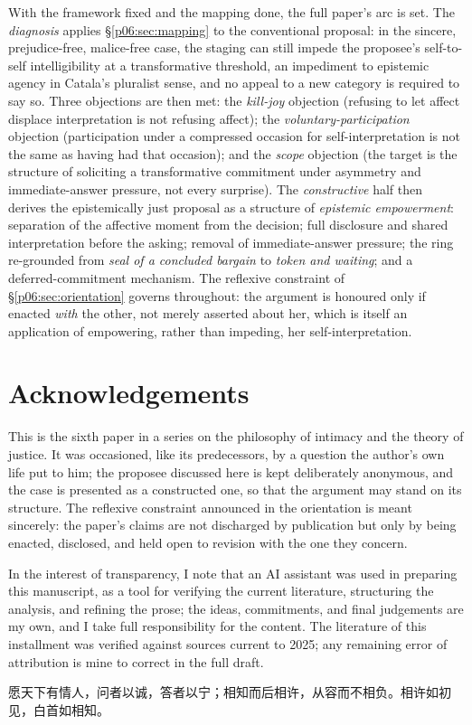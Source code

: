 \documentclass[11pt,a4paper]{article}
\begin{document}
With the framework fixed and the mapping done, the full paper's arc is set. The \emph{diagnosis} applies §\ref{p06:sec:mapping} to the conventional proposal: in the sincere, prejudice-free, malice-free case, the staging can still impede the proposee's self-to-self intelligibility at a transformative threshold, an impediment to epistemic agency in Catala's pluralist sense, and no appeal to a new category is required to say so. Three objections are then met: the \emph{kill-joy} objection (refusing to let affect displace interpretation is not refusing affect); the \emph{voluntary-participation} objection (participation under a compressed occasion for self-interpretation is not the same as having had that occasion); and the \emph{scope} objection (the target is the structure of soliciting a transformative commitment under asymmetry and immediate-answer pressure, not every surprise). The \emph{constructive} half then derives the epistemically just proposal as a structure of \emph{epistemic empowerment}: separation of the affective moment from the decision; full disclosure and shared interpretation before the asking; removal of immediate-answer pressure; the ring re-grounded from \emph{seal of a concluded bargain} to \emph{token and waiting}; and a deferred-commitment mechanism. The reflexive constraint of §\ref{p06:sec:orientation} governs throughout: the argument is honoured only if enacted \emph{with} the other, not merely asserted about her, which is itself an application of empowering, rather than impeding, her self-interpretation.

\section*{Acknowledgements}

This is the sixth paper in a series on the philosophy of intimacy and the theory of justice. It was occasioned, like its predecessors, by a question the author's own life put to him; the proposee discussed here is kept deliberately anonymous, and the case is presented as a constructed one, so that the argument may stand on its structure. The reflexive constraint announced in the orientation is meant sincerely: the paper's claims are not discharged by publication but only by being enacted, disclosed, and held open to revision with the one they concern.

In the interest of transparency, I note that an AI assistant was used in preparing this manuscript, as a tool for verifying the current literature, structuring the analysis, and refining the prose; the ideas, commitments, and final judgements are my own, and I take full responsibility for the content. The literature of this installment was verified against sources current to 2025; any remaining error of attribution is mine to correct in the full draft.

\begin{center}
{\cjkfont\color{rosedeep} 愿天下有情人，问者以诚，答者以宁；相知而后相许，从容而不相负。相许如初见，白首如相知。}
\end{center}

\printbibliography[heading=bibintoc]
\end{document}
